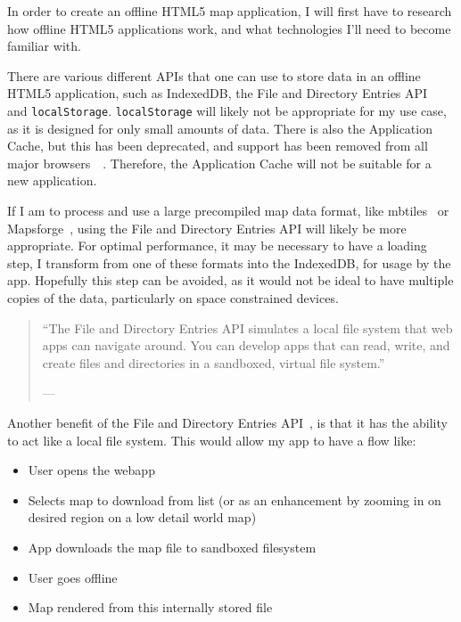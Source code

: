 In order to create an offline HTML5 map application, I will first have to research how offline HTML5 applications work, and what technologies I'll need to become familiar with.

There are various different APIs that one can use to store data in an offline HTML5 application, such as IndexedDB, the File and Directory Entries API~\cite{w3c-file-directories-api}~\cite{mdn-file-directories-api} and \texttt{localStorage}. \texttt{localStorage} will likely not be appropriate for my use case, as it is designed for only small amounts of data. There is also the Application Cache, but this has been deprecated, and support has been removed from all major browsers~\cite{whatwg-application-cache}~\cite{mdn-application-cache}. Therefore, the Application Cache will not be suitable for a new application.

If I am to process and use a large precompiled map data format, like mbtiles~\cite{mbtiles-spec} or Mapsforge~\cite{mapsforge-format}, using the File and Directory Entries API will likely be more appropriate. For optimal performance, it may be necessary to have a loading step, I transform from one of these formats into the IndexedDB, for usage by the app. Hopefully this step can be avoided, as it would not be ideal to have multiple copies of the data, particularly on space constrained devices.

\begin{quote}
    ``The File and Directory Entries API simulates a local file system that web apps can navigate around. You can develop apps that can read, write, and create files and directories in a sandboxed, virtual file system.''
    
    \footnotesize{--- }
\end{quote}

Another benefit of the File and Directory Entries API~\cite{w3c-file-directories-api}, is that it has the ability to act like a local file system. This would allow my app to have a flow like:

\begin{itemize}
    \item User opens the webapp
    \item Selects map to download from list (or as an enhancement by zooming in on desired region on a low detail world map)
    \item App downloads the map file to sandboxed filesystem
    \item User goes offline
    \item Map rendered from this internally stored file
\end{itemize}

